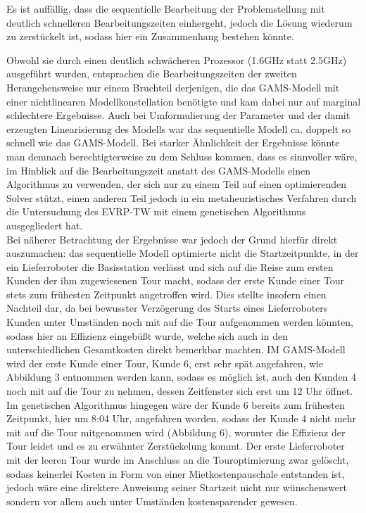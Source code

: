 \documentclass[a4paper,12pt,parskip,bibtotoc,liststotoc]{article}
\begin{document}
Es ist auffällig, dass die sequentielle Bearbeitung der Problemstellung mit deutlich schnelleren Bearbeitungszeiten einhergeht, jedoch die Lösung wiederum zu zerstückelt ist, sodass hier ein Zusammenhang bestehen könnte.

Obwohl sie durch einen deutlich schwächeren Prozessor (1.6GHz statt 2.5GHz) ausgeführt wurden, entsprachen die Bearbeitungszeiten der zweiten Herangehensweise nur einem Bruchteil derjenigen, die das GAMS-Modell mit einer nichtlinearen Modellkonstellation benötigte und kam dabei nur auf marginal schlechtere Ergebnisse.
Auch bei Umformulierung der Parameter und der damit erzeugten Linearisierung des Modells war das sequentielle Modell ca. doppelt so schnell wie das GAMS-Modell.
Bei starker Ähnlichkeit der Ergebnisse könnte man demnach berechtigterweise zu dem Schluss kommen, dass es sinnvoller wäre, im Hinblick auf die Bearbeitungszeit anstatt des GAMS-Modells einen Algorithmus zu verwenden, der sich nur zu einem Teil auf einen optimierenden Solver stützt, einen anderen Teil jedoch in ein metaheuristisches Verfahren durch die Untersuchung des EVRP-TW mit einem genetischen Algorithmus ausgegliedert hat.\\

Bei näherer Betrachtung der Ergebnisse war jedoch der Grund hierfür direkt auszumachen: das sequentielle Modell optimierte nicht die Startzeitpunkte, in der ein Lieferroboter die Basisstation verlässt und sich auf die Reise zum ersten Kunden der ihm zugewiesenen Tour macht, sodass der erste Kunde einer Tour stets zum frühesten Zeitpunkt angetroffen wird.
Dies stellte insofern einen Nachteil dar, da bei bewusster Verzögerung des Starts eines Lieferroboters Kunden unter Umständen noch mit auf die Tour aufgenommen werden könnten, sodass hier an Effizienz eingebüßt wurde, welche sich auch in den unterschiedlichen Gesamtkosten direkt bemerkbar machten. 
IM GAMS-Modell wird der erste Kunde einer Tour, Kunde 6, erst sehr spät angefahren, wie Abbildung 3 entnommen werden kann, sodass es möglich ist, auch den Kunden 4 noch mit auf die Tour zu nehmen, dessen Zeitfenster sich erst um 12 Uhr öffnet. 
Im genetischen Algorithmus hingegen wäre der Kunde 6 bereits zum frühesten Zeitpunkt, hier um 8:04 Uhr, angefahren worden, sodass der Kunde 4 nicht mehr mit auf die Tour mitgenommen wird (Abbildung 6), worunter die Effizienz der Tour leidet und es zu erwähnter Zerstückelung kommt.
Der erste Lieferroboter mit der leeren Tour wurde im Anschluss an die Touroptimierung zwar gelöscht, sodass keinerlei Kosten in Form von einer Mietkostenpauschale entstanden ist, jedoch wäre eine direktere Anweisung seiner Startzeit nicht nur wünschenswert sondern vor allem auch unter Umständen kostensparender gewesen.\\
\end{document}
